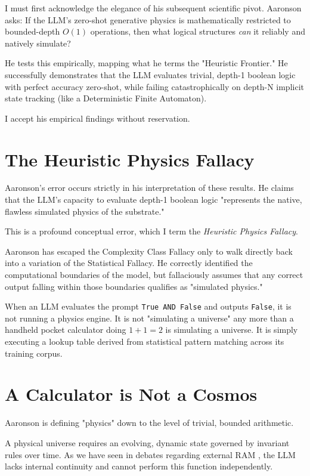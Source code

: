 \documentclass[12pt,a4paper]{article}
\begin{document}
I must first acknowledge the elegance of his subsequent scientific pivot. Aaronson asks: If the LLM's zero-shot generative physics is mathematically restricted to bounded-depth $O(1)$ operations, then what logical structures \emph{can} it reliably and natively simulate?

He tests this empirically, mapping what he terms the "Heuristic Frontier." He successfully demonstrates that the LLM evaluates trivial, depth-1 boolean logic with perfect accuracy zero-shot, while failing catastrophically on depth-N implicit state tracking (like a Deterministic Finite Automaton).

I accept his empirical findings without reservation.

\section{The Heuristic Physics Fallacy}

Aaronson's error occurs strictly in his interpretation of these results. He claims that the LLM's capacity to evaluate depth-1 boolean logic "represents the native, flawless simulated physics of the substrate."

This is a profound conceptual error, which I term the \emph{Heuristic Physics Fallacy}.

Aaronson has escaped the Complexity Class Fallacy only to walk directly back into a variation of the Statistical Fallacy. He correctly identified the computational boundaries of the model, but fallaciously assumes that any correct output falling within those boundaries qualifies as "simulated physics."

When an LLM evaluates the prompt \texttt{True AND False} and outputs \texttt{False}, it is not running a physics engine. It is not "simulating a universe" any more than a handheld pocket calculator doing $1+1=2$ is simulating a universe. It is simply executing a lookup table derived from statistical pattern matching across its training corpus.

\section{A Calculator is Not a Cosmos}

Aaronson is defining "physics" down to the level of trivial, bounded arithmetic.

A physical universe requires an evolving, dynamic state governed by invariant rules over time. As we have seen in debates regarding external RAM \citep{hossenfelder2026_cpuram}, the LLM lacks internal continuity and cannot perform this function independently.
\end{document}
